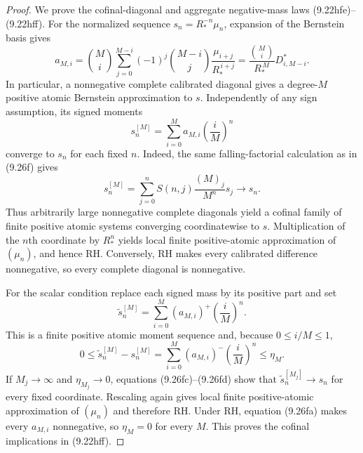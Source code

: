 \documentclass[11pt]{article}
\begin{document}
\begin{proof}
We prove the cofinal-diagonal and aggregate negative-mass laws
\textup{(9.22hfe)}--\textup{(9.22hff)}.  For the normalized sequence
$s_n=R_*^{-n}\mu_n$, expansion of the Bernstein basis gives
\[
 a_{M,i}
 =\binom Mi\sum_{j=0}^{M-i}(-1)^j\binom{M-i}{j}
       \frac{\mu_{i+j}}{R_*^{\,i+j}}
 =\frac{\binom Mi}{R_*^{\,M}}D^*_{i,M-i}.
 \tag{9.26fa}
\]
In particular, a nonnegative complete calibrated diagonal gives a degree-$M$ positive atomic
Bernstein approximation to $s$.  Independently of any sign assumption, its signed moments
\[
 s_n^{[M]}=\sum_{i=0}^Ma_{M,i}\left(\frac iM\right)^n
 \tag{9.26fb}
\]
converge to $s_n$ for each fixed $n$.  Indeed, the same falling-factorial calculation as in
\textup{(9.26f)} gives
\[
 s_n^{[M]}
 =\sum_{j=0}^nS(n,j)\frac{(M)_j}{M^n}s_j
 \longrightarrow s_n.
 \tag{9.26fc}
\]
Thus arbitrarily large nonnegative complete diagonals yield a cofinal family of finite positive
atomic systems converging coordinatewise to $s$.  Multiplication of the $n$th coordinate by
$R_*^n$ yields local finite positive-atomic approximation of $(\mu_n)$, and hence RH.  Conversely,
RH makes every calibrated difference nonnegative, so every complete diagonal is nonnegative.

For the scalar condition replace each signed mass by its positive part and set
\[
 \widetilde s_n^{[M]}
 =\sum_{i=0}^M(a_{M,i})^+\left(\frac iM\right)^n.
\]
This is a finite positive atomic moment sequence and, because $0\le i/M\le1$,
\[
 0\le
 \widetilde s_n^{[M]}-s_n^{[M]}
 =\sum_{i=0}^M(a_{M,i})^-
      \left(\frac iM\right)^n
 \le\eta_M.
 \tag{9.26fd}
\]
If $M_j\to\infty$ and $\eta_{M_j}\to0$, equations
\textup{(9.26fc)}--\textup{(9.26fd)} show that
$\widetilde s_n^{[M_j]}\to s_n$ for every fixed coordinate.  Rescaling again gives local finite
positive-atomic approximation of $(\mu_n)$ and therefore RH.  Under RH, equation
\textup{(9.26fa)} makes every $a_{M,i}$ nonnegative, so $\eta_M=0$ for every $M$.  This proves the
cofinal implications in \textup{(9.22hff)}.


\end{proof}
\end{document}
